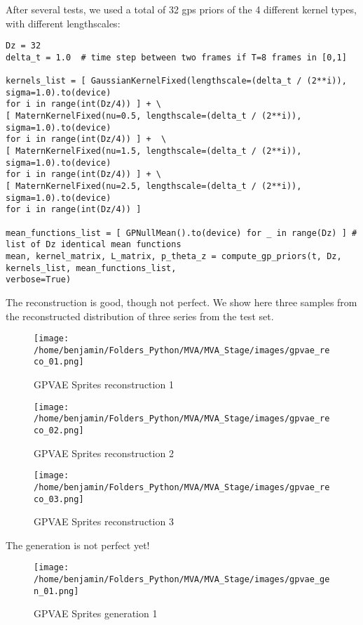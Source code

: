 After several tests, we used a total of 32 \glspl{gp} priors of the 4 different kernel types, with different lengthscales:
\begin{verbatim}
Dz = 32
delta_t = 1.0  # time step between two frames if T=8 frames in [0,1]

kernels_list = [ GaussianKernelFixed(lengthscale=(delta_t / (2**i)), sigma=1.0).to(device) 
for i in range(int(Dz/4)) ] + \
[ MaternKernelFixed(nu=0.5, lengthscale=(delta_t / (2**i)), sigma=1.0).to(device) 
for i in range(int(Dz/4)) ] +  \
[ MaternKernelFixed(nu=1.5, lengthscale=(delta_t / (2**i)), sigma=1.0).to(device) 
for i in range(int(Dz/4)) ] + \
[ MaternKernelFixed(nu=2.5, lengthscale=(delta_t / (2**i)), sigma=1.0).to(device) 
for i in range(int(Dz/4)) ]

mean_functions_list = [ GPNullMean().to(device) for _ in range(Dz) ] # list of Dz identical mean functions
mean, kernel_matrix, L_matrix, p_theta_z = compute_gp_priors(t, Dz, kernels_list, mean_functions_list, 
verbose=True)
\end{verbatim}

The reconstruction is good, though not perfect. We show here three samples from the reconstructed distribution of three series from the test set. 
\begin{figure}[H]
    \centering
    \texttt{[image: /home/benjamin/Folders\_Python/MVA/MVA\_Stage/images/gpvae\_reco\_01.png]}
    \caption{GPVAE Sprites reconstruction 1}
    \label{fig:GPVAE Sprites reconstruction 1}
\end{figure}

\begin{figure}[H]
    \centering
    \texttt{[image: /home/benjamin/Folders\_Python/MVA/MVA\_Stage/images/gpvae\_reco\_02.png]}
    \caption{GPVAE Sprites reconstruction 2}
    \label{fig:GPVAE Sprites reconstruction 2}
\end{figure}

\begin{figure}[H]
    \centering
    \texttt{[image: /home/benjamin/Folders\_Python/MVA/MVA\_Stage/images/gpvae\_reco\_03.png]}
    \caption{GPVAE Sprites reconstruction 3}
    \label{fig:GPVAE Sprites reconstruction 3}
\end{figure}

The generation is not perfect yet!

\begin{figure}[H]
    \centering
    \texttt{[image: /home/benjamin/Folders\_Python/MVA/MVA\_Stage/images/gpvae\_gen\_01.png]}
    \caption{GPVAE Sprites generation 1}
    \label{fig:GPVAE Sprites generation 1}
\end{figure}
